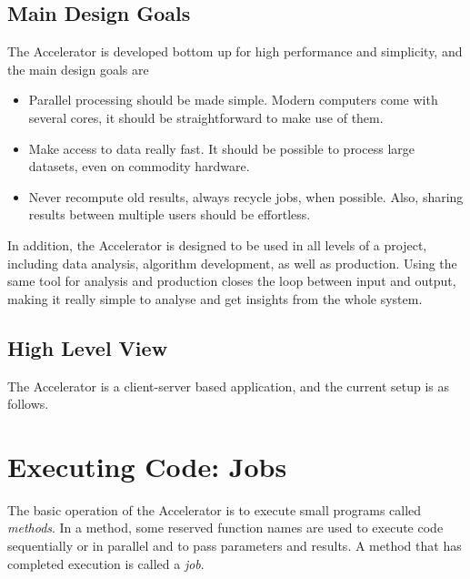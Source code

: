 \documentclass[a4paper]{article}
\begin{document}
\subsection{Main Design Goals}
The Accelerator is developed bottom up for high performance and
simplicity, and the main design goals are
\begin{itemize}
\item[] Parallel processing should be made simple.  Modern computers
  come with several cores, it should be straightforward to make use of
  them.
\item[] Make access to data really fast.  It should be possible to
  process large datasets, even on commodity hardware.
\item[] Never recompute old results, always recycle jobs, when
  possible.  Also, sharing results between multiple users should be
  effortless.
\end{itemize}
In addition, the Accelerator is designed to be used in all levels of a
project, including data analysis, algorithm development, as well as
production.  Using the same tool for analysis and production closes
the loop between input and output, making it really simple to analyse
and get insights from the whole system.

\subsection{High Level View}

The Accelerator is a client-server based application, and the current
setup is as follows.

\begin{figure}[h!]
  \begin{center}
    
    \caption{}
    \label{fig:overview}
  \end{center}
\end{figure}






\clearpage
\section{Executing Code: Jobs}
The basic operation of the Accelerator is to execute small programs
called \textsl{methods}.  In a method, some reserved function names
are used to execute code sequentially or in parallel and to pass
parameters and results.  A method that has completed execution is
called a \textsl{job}.
\end{document}
